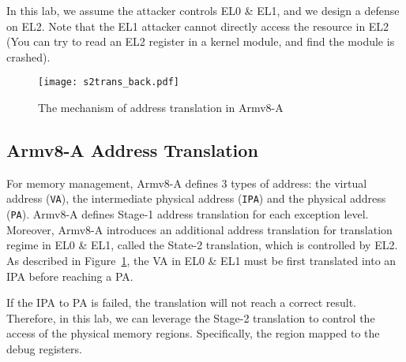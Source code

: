 In this lab, we assume the attacker controls EL0 \& EL1, and we design a defense on EL2.
Note that the EL1 attacker cannot directly access the resource in EL2 (You can try to read an EL2 register in a kernel module, and find the module is crashed). 


\begin{figure}[htb]
	\centering
	\texttt{[image: s2trans\_back.pdf]}
	\caption{The mechanism of address translation in Armv8-A}
	\label{fig:armat}
\end{figure}

\subsection{Armv8-A Address Translation}

For memory management, Armv8-A defines 3 types of address: the virtual address (\texttt{VA}),
the intermediate physical address (\texttt{IPA}) and the physical address
(\texttt{PA}).
Armv8-A defines Stage-1 address translation for each exception level. 
Moreover, Armv8-A introduces an additional address translation for translation regime in EL0 \& EL1, called the State-2 translation, which is controlled by EL2.
As described in
Figure~\ref{fig:armat}, the VA in EL0 \& EL1 must be first translated into an IPA before reaching a PA.

If the IPA to PA is failed, the translation will not reach a correct result.
Therefore, in this lab, we can leverage the Stage-2 translation to control the access of the physical memory regions. Specifically, the region mapped to the debug registers.
